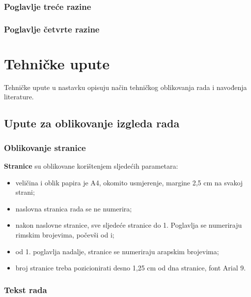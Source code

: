 \documentclass[]{foi}
\begin{document}
\subsection{Poglavlje treće razine}

\lipsum[2]



\subsection{Poglavlje četvrte razine}

\lipsum[4-5]



\chapter{Tehničke upute}

Tehničke upute u nastavku opisuju način tehničkog oblikovanja rada i navođenja literature.



\section{Upute za oblikovanje izgleda rada}

\subsection{Oblikovanje stranice}

\textbf{Stranice} su oblikovane korištenjem sljedećih parametara:

\begin{itemize}
	\item veličina i oblik papira je A4, okomito usmjerenje, margine 2,5 cm na svakoj strani;

	\item naslovna stranica rada se ne numerira;

	\item nakon naslovne stranice, sve sljedeće stranice do 1. Poglavlja se numeriraju rimskim brojevima, počevši od i;

	\item od 1. poglavlja nadalje, stranice se numeriraju arapskim brojevima;

	\item broj stranice treba pozicionirati desno 1,25 cm od dna stranice, font Arial 9.
\end{itemize}

\subsection{Tekst rada}
\end{document}
